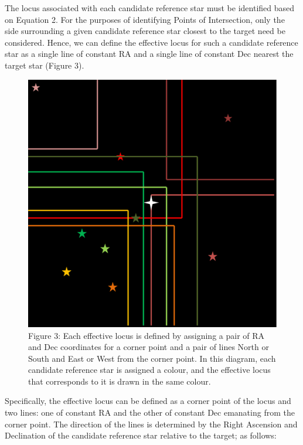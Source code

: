 \documentclass[]{elsarticle} %
\makeatletter
\def\maxwidth{\ifdim\Gin@nat@width>\linewidth\linewidth
\else\Gin@nat@width\fi}
\let\Oldincludegraphics\includegraphics
\renewcommand{\includegraphics}[1]{\Oldincludegraphics[width=\maxwidth]{#1}}
\makeatother
\begin{document}
The locus associated with each candidate reference star must be
identified based on Equation 2. For the purposes of identifying Points
of Intersection, only the side surrounding a given candidate reference
star closest to the target need be considered. Hence, we can define the
effective locus for such a candidate reference star as a single line of
constant RA and a single line of constant Dec nearest the target star
(Figure 3).

\begin{figure}
\centering
\includegraphics{fig3.png}
\caption{Figure 3: Each effective locus is defined by assigning a pair
of RA and Dec coordinates for a corner point and a pair of lines North
or South and East or West from the corner point. In this diagram, each
candidate reference star is assigned a colour, and the effective locus
that corresponds to it is drawn in the same colour.}
\end{figure}

Specifically, the effective locus can be defined as a corner point of
the locus and two lines: one of constant RA and the other of constant
Dec emanating from the corner point. The direction of the lines is
determined by the Right Ascension and Declination of the candidate
reference star relative to the target; as follows:
\end{document}
